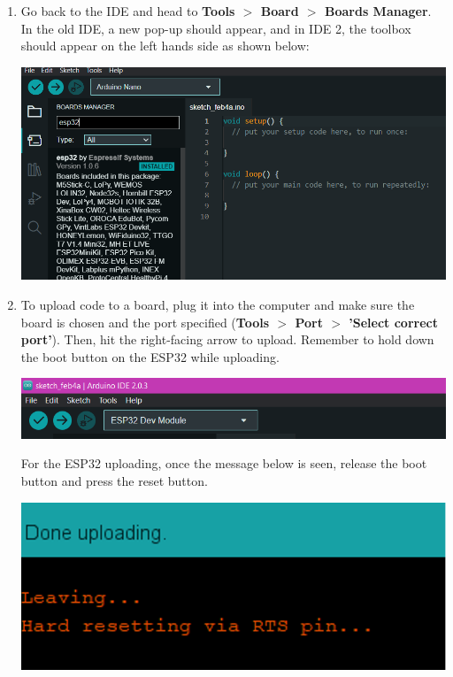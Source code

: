 \documentclass[a4paper,12pt]{report}
\newcommand{\imageWidth}{140mm}
\begin{document}
\begin{enumerate}
        \newpage
        \item Go back to the IDE and head to \textbf{Tools $>$ Board $>$ Boards Manager}. In the old IDE, a new pop-up should appear, and in IDE 2, the toolbox should appear on the left hands side as shown below:
        
        \begin{center}
            \includegraphics[width = \imageWidth]{Assets/Boards_manager.png}
        \end{center}
    
        \item To upload code to a board, plug it into the computer and make sure the board is chosen and the port specified (\textbf{Tools $>$ Port $>$ 'Select correct port'}). 
        Then, hit the right-facing arrow to upload. Remember to hold down the boot button on the ESP32 while uploading.
        \begin{center}
            \includegraphics[width = \imageWidth]{Assets/Upload.png}
        \end{center}
        For the ESP32 uploading, once the message below is seen, release the boot button and press the reset button.
        \begin{center}
            \includegraphics[scale = 0.7]{Assets/Hard_reset.png}
        \end{center}
    \end{enumerate}
\end{document}
